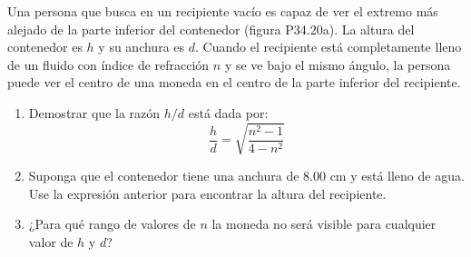 \item Una persona que busca en un recipiente vacío es capaz de ver el extremo más alejado de la parte inferior del contenedor (figura P34.20a). La altura del contenedor es $h$ y su anchura es $d$. Cuando el recipiente está completamente lleno de un fluido con índice de refracción $n$ y se ve bajo el mismo ángulo, la persona puede ver el centro de una moneda en el centro de la parte inferior del recipiente.
\begin{enumerate}
    \item Demostrar que la razón $h/d$ está dada por:
    $$ \frac{h}{d} = \sqrt{\frac{n^2 - 1}{4 - n^2}} $$
    \item Suponga que el contenedor tiene una anchura de $8.00\text{ cm}$ y está lleno de agua. Use la expresión anterior para encontrar la altura del recipiente.
    \item ¿Para qué rango de valores de $n$ la moneda no será visible para cualquier valor de $h$ y $d$?
\end{enumerate}